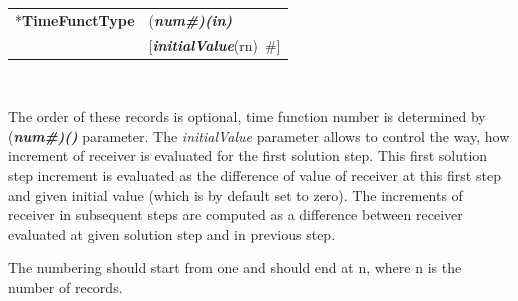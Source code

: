 \documentclass[a4paper]{article}
\makeatletter
\newcommand{\param}[1]{{\em #1}}
\newcommand{\fieldVal}[2]{\mbox{({\it\bf{#1}\#)\tiny (#2)}}}
\newcommand{\keywordnotype}[1]{\mbox{{\it{\bf{#1}}}}}
\newcommand{\keyword}[2]{\mbox{{\keywordnotype{#1}\tiny (#2)}}}
\newcommand{\entKeyword}[1]{\mbox{{*{\bf{#1}}}}}
\newcommand{\field}[2]{\mbox{\keyword{#1}{#2}~\#}}
\newcommand{\optField}[2]{\mbox{[\field{#1}{#2}]}}
\newenvironment{record}[1][]{\begin{tabular}{|ll}}{\end{tabular}\\}
\newcommand{\recentry}[2]{{#1}&{#2}\\}
\newcounter{rcc}
\newenvironment{record}[1][\textwidth]{\setcounter{rcc}{0}\begin{tabular*}{#1}{|ll@{\extracolsep{\fill}}r}}{\end{tabular*}\\}
\newcommand{\recentry}[2]{\ifthenelse{\value{rcc}>0}{&$\backslash$ \\}{\setcounter{rcc}{1}}{#1}&{#2}}
\makeatother
\begin{document}
\noindent
\begin{record}
  \recentry{\entKeyword{TimeFunctType}}{\fieldVal{num}{in}}
  \recentry{}{\optField{initialValue}{rn}}
\end{record}

The order of these records is optional, time function number is determined by \fieldVal{num}{} parameter. The \param{initialValue} parameter allows to control the way, how increment of receiver is evaluated for the first solution step. 
This first solution step increment is evaluated as the difference of value of receiver at this first step and given initial value (which is by default set to zero). The increments of receiver in subsequent steps are computed as a difference between receiver evaluated at given solution step and in previous step.

The numbering should start from one and should end at n, where n is the number of records.
\end{document}
